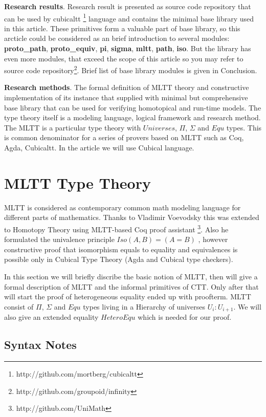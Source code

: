 \documentclass{article}
\begin{document}
{\bf Research results}. Research result is presented as source code repository that can be used by
cubicaltt \footnote{http://github.com/mortberg/cubicaltt} language and contains the minimal base library used in this article.
These primitives form a valuable part of base library, so this arcticle could be
considered as an brief introduction to several modules: {\bf proto\_path}, {\bf proto\_equiv}, {\bf pi},
{\bf sigma}, {\bf mltt}, {\bf path}, {\bf iso}. But the library has even more modules, that
exceed the scope of this article so you may refer to source code
repository\footnote{http://github.com/groupoid/infinity}. Brief list of base library modules is given
in Conclusion.

{\bf Research methods}. The formal definition of MLTT theory and constructive
implementation of its instance that supplied with minimal but comprehensive base library that
can be used for verifying homotopical and run-time models. The type theory itself is a modeling
language, logical framework and research method. The MLTT is a particular type theory with
$Universes$, $\Pi$, $\Sigma$ and $Equ$ types. This is common denominator for a series of provers
based on MLTT such as Coq, Agda, Cubicaltt. In the article we will use Cubical language.

\section{MLTT Type Theory}

MLTT is considered as contemporary common math modeling language for different parts of mathematics.
Thanks to Vladimir Voevodsky this was extended to Homotopy Theory
using MLTT-based Coq proof assistant \footnote{http://github.com/UniMath}.
Also he formulated the univalence principle $Iso(A,B)=(A=B)$ \cite{HoTT},
however constructive proof that isomorphism equals to equality and equivalences is possible only
in Cubical Type Theory \cite{Mortberg17} (Agda and Cubical type checkers).

In this section we will briefly discribe the basic notion of MLTT, then will give a formal
description of MLTT and the informal primitives of CTT. Only after that will start
the proof of heterogeneous equality ended up with proofterm. MLTT consist of
$\Pi$, $\Sigma$ and $Equ$ types living in a Hierarchy of universes $U_i : U_{i+1}$. We will
also give an extended equality $HeteroEqu$ which is needed for our proof.

\subsection{Syntax Notes}
\end{document}
